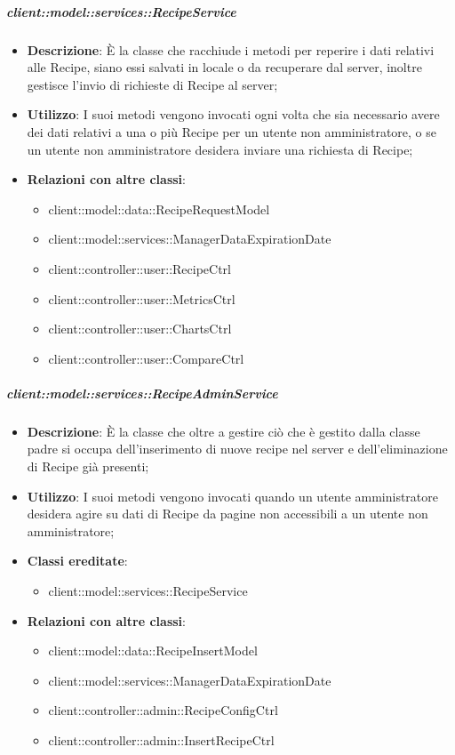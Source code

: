 		\subparagraph{client::model::services::RecipeService} %
		\label{subp:client_model_services_recipeservice}
			\begin{itemize}
				\item \textbf{Descrizione}: È la classe che racchiude i metodi per reperire i dati relativi alle Recipe, siano essi salvati in locale o da recuperare dal server, inoltre gestisce l'invio di richieste di Recipe al server;
				\item \textbf{Utilizzo}: I suoi metodi vengono invocati ogni volta che sia necessario avere dei dati relativi a una o più Recipe per un utente non amministratore, o se un utente non amministratore desidera inviare una richiesta di Recipe;
				\item \textbf{Relazioni con altre classi}: 					
					\begin{itemize}
						\item client::model::data::RecipeRequestModel
						\item client::model::services::ManagerDataExpirationDate
						\item client::controller::user::RecipeCtrl
						\item client::controller::user::MetricsCtrl
						\item client::controller::user::ChartsCtrl						
						\item client::controller::user::CompareCtrl
					\end{itemize}
			\end{itemize}

		\subparagraph{client::model::services::RecipeAdminService} %
		\label{subp:client_model_services_recipeadminservice}
			\begin{itemize}
				\item \textbf{Descrizione}: È la classe che oltre a gestire ciò che è gestito dalla classe padre si occupa dell'inserimento di nuove recipe nel server e dell'eliminazione di Recipe già presenti;
				\item \textbf{Utilizzo}: I suoi metodi vengono invocati quando un utente amministratore desidera agire su dati di Recipe da pagine non accessibili a un utente non amministratore;
				\item \textbf{Classi ereditate}:					
					\begin{itemize}
						\item client::model::services::RecipeService
					\end{itemize}
				\item \textbf{Relazioni con altre classi}:
					\begin{itemize}
						\item client::model::data::RecipeInsertModel
						\item client::model::services::ManagerDataExpirationDate
						\item client::controller::admin::RecipeConfigCtrl
						\item client::controller::admin::InsertRecipeCtrl
					\end{itemize}
			\end{itemize}



